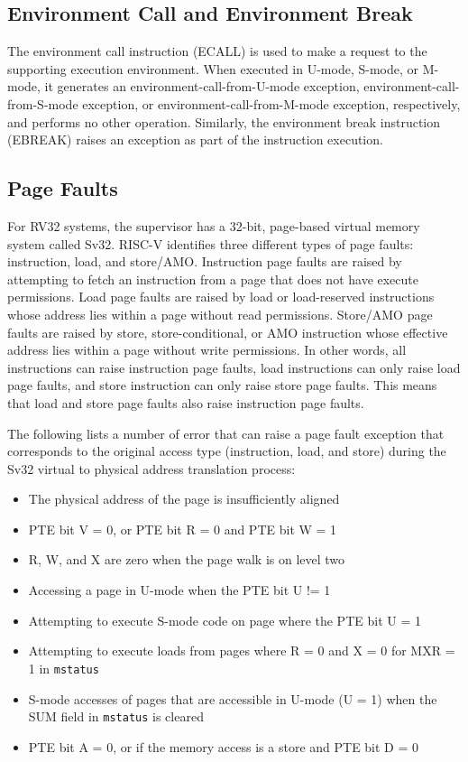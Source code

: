 \documentclass[12pt]{article}
\begin{document}
\subsection{Environment Call and Environment Break}
The environment call instruction (ECALL) is used to make a request to the supporting execution environment. When executed in U-mode, S-mode, or M-mode, it generates an environment-call-from-U-mode exception, environment-call-from-S-mode exception, or environment-call-from-M-mode exception, respectively, and performs no other operation. Similarly, the environment break instruction (EBREAK) raises an exception as part of the instruction execution.

\subsection{Page Faults}
For RV32 systems, the supervisor has a 32-bit, page-based virtual memory system called Sv32. RISC-V identifies three different types of page faults: instruction, load, and store/AMO. Instruction page faults are raised by attempting to fetch an instruction from a page that does not have execute permissions. Load page faults are raised by load or load-reserved instructions whose address lies within a page without read permissions. Store/AMO page faults are raised by store, store-conditional, or AMO instruction whose effective address lies within a page without write permissions. In other words, all instructions can raise instruction page faults, load instructions can only raise load page faults, and store instruction can only raise store page faults. This means that load and store page faults also raise instruction page faults. 

The following lists a number of error that can raise a page fault exception that corresponds to the original access type (instruction, load, and store) during the Sv32 virtual to physical address translation process:
\begin{itemize}
    \item The physical address of the page is insufficiently aligned
    \item PTE bit V = 0, or PTE bit R = 0 and PTE bit W = 1
    \item R, W, and X are zero when the page walk is on level two
    \item Accessing a page in U-mode when the PTE bit U != 1
    \item Attempting to execute S-mode code on page where the PTE bit U = 1
    \item Attempting to execute loads from pages where R = 0 and X = 0 for MXR = 1 in {\tt{mstatus}}
    \item S-mode accesses of pages that are accessible in U-mode (U = 1) when the SUM field in {\tt{mstatus}} is cleared
    \item PTE bit A = 0, or if the memory access is a store and PTE bit D = 0
\end{itemize}
\end{document}
